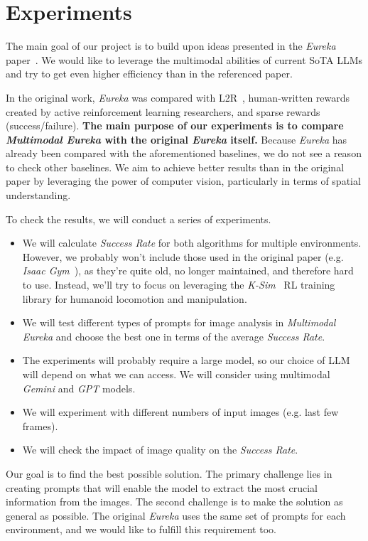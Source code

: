 \documentclass[10pt,twocolumn]{article}
\begin{document}
\section{Experiments}
The main goal of our project is to build upon ideas presented in the \textit{Eureka} paper~\cite{eureka}. We would like to leverage the multimodal abilities of current SoTA LLMs and try to get even higher efficiency than in the referenced paper.

In the original work, \textit{Eureka} was compared with L2R~\cite{l2r}, human-written rewards created by active reinforcement learning researchers, and sparse rewards (success/failure). \textbf{The main purpose of our experiments is to compare \textit{Multimodal Eureka} with the original \textit{Eureka} itself.} Because \textit{Eureka} has already been compared with the aforementioned baselines, we do not see a reason to check other baselines. We aim to achieve better results than in the original paper by leveraging the power of computer vision, particularly in terms of spatial understanding.

To check the results, we will conduct a series of experiments.

\begin{itemize}
    \item We will calculate \textit{Success Rate} for both algorithms for multiple environments. However, we probably won't include those used in the original paper (e.g. \textit{Isaac Gym}~\cite{isaac_gym}), as they're quite old, no longer maintained, and therefore hard to use. Instead, we'll try to focus on leveraging the \textit{K-Sim}~\cite{ksim_repo} RL training library for humanoid locomotion and manipulation.
    \item We will test different types of prompts for image analysis in \textit{Multimodal Eureka} and choose the best one in terms of the average \textit{Success Rate}.
    \item The experiments will probably require a large model, so our choice of LLM will depend on what we can access. We will consider using multimodal \textit{Gemini} and \textit{GPT} models.
    \item We will experiment with different numbers of input images (e.g. last few frames).
    \item We will check the impact of image quality on the \textit{Success Rate}.
\end{itemize}

Our goal is to find the best possible solution. The primary challenge lies in creating prompts that will enable the model to extract the most crucial information from the images. The second challenge is to make the solution as general as possible. The original \textit{Eureka} uses the same set of prompts for each environment, and we would like to fulfill this requirement too.
\end{document}
